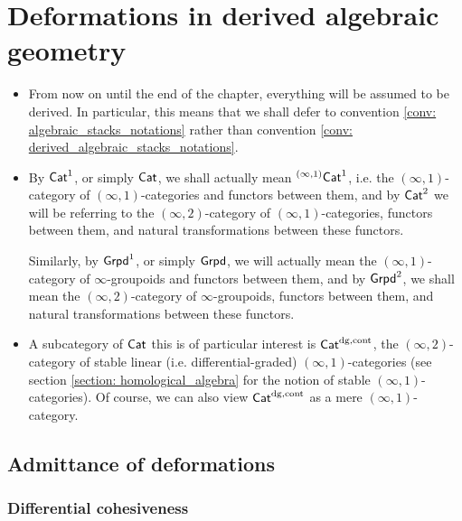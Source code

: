    \section{Deformations in derived algebraic geometry}
        \begin{convention} \label{conv: deformation_theory_everything_is_derived}
            \noindent
            \begin{itemize}
                \item From now on until the end of the chapter, everything will be assumed to be derived. In particular, this means that we shall defer to convention \ref{conv: algebraic_stacks_notations} rather than convention \ref{conv: derived_algebraic_stacks_notations}.
                \item By $\mathsf{Cat}^1$, or simply $\mathsf{Cat}$, we shall actually mean ${}^{(\infty, 1)}\mathsf{Cat}^1$, i.e. the $(\infty, 1)$-category of $(\infty, 1)$-categories and functors between them, and by $\mathsf{Cat}^2$ we will be referring to the $(\infty, 2)$-category of $(\infty, 1)$-categories, functors between them, and natural transformations between these functors. 
                
                Similarly, by $\mathsf{Grpd}^1$, or simply $\mathsf{Grpd}$, we will actually mean the $(\infty, 1)$-category of $\infty$-groupoids and functors between them, and by $\mathsf{Grpd}^2$, we shall mean the $(\infty, 2)$-category of $\infty$-groupoids, functors between them, and natural transformations between these functors.
                \item A subcategory of $\mathsf{Cat}$ this is of particular interest is $\mathsf{Cat}^{\mathrm{dg}, \mathrm{cont}}$, the $(\infty, 2)$-category of stable linear (i.e. differential-graded) $(\infty, 1)$-categories (see section \ref{section: homological_algebra} for the notion of stable $(\infty, 1)$-categories). Of course, we can also view $\mathsf{Cat}^{\mathrm{dg}, \mathrm{cont}}$ as a mere $(\infty, 1)$-category.
            \end{itemize}
        \end{convention}
        
        \subsection{Admittance of deformations}
            \subsubsection{Differential cohesiveness}
                
